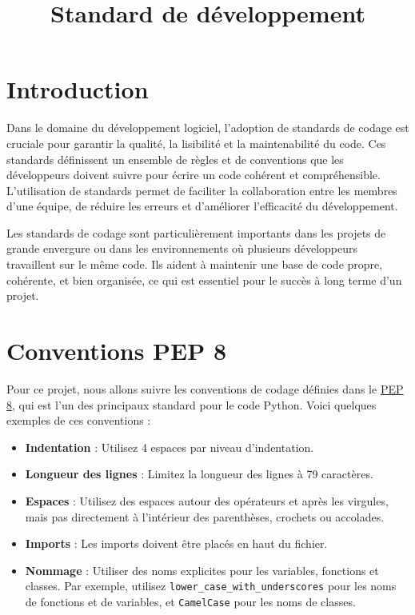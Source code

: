 \documentclass[a4paper,12pt]{article}
\title{Standard de développement}
\author{}
\date{}
\begin{document}
\makeonlytitle

\section{Introduction}

Dans le domaine du développement logiciel, l'adoption de standards de codage est cruciale pour garantir la qualité, la lisibilité et la maintenabilité du code. Ces standards définissent un ensemble de règles et de conventions que les développeurs doivent suivre pour écrire un code cohérent et compréhensible. L'utilisation de standards permet de faciliter la collaboration entre les membres d'une équipe, de réduire les erreurs et d'améliorer l'efficacité du développement.

Les standards de codage sont particulièrement importants dans les projets de grande envergure ou dans les environnements où plusieurs développeurs travaillent sur le même code. Ils aident à maintenir une base de code propre, cohérente, et bien organisée, ce qui est essentiel pour le succès à long terme d'un projet.


\section{Conventions PEP 8}

Pour ce projet, nous allons suivre les conventions de codage définies dans le \href{https://peps.python.org/pep-0008/}{PEP 8}, qui est l'un des principaux standard pour le code Python. Voici quelques exemples de ces conventions :

\begin{itemize} 
  \item \textbf{Indentation} : Utilisez 4 espaces par niveau d'indentation.
  \item \textbf{Longueur des lignes} : Limitez la longueur des lignes à 79 caractères.
  \item \textbf{Espaces} : Utilisez des espaces autour des opérateurs et après les virgules, mais pas directement à l'intérieur des parenthèses, crochets ou accolades.
  \item \textbf{Imports} : Les imports doivent être placés en haut du fichier.
  \item \textbf{Nommage} : Utiliser des noms explicites pour les variables, fonctions et classes. Par exemple, utilisez \texttt{lower\_case\_with\_underscores} pour les noms de fonctions et de variables, et \texttt{CamelCase} pour les noms de classes.
\end{itemize}
\end{document}
